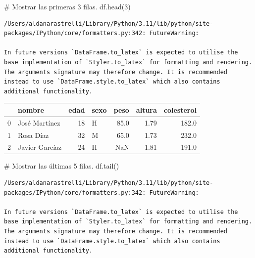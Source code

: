 \documentclass[
  letterpaper,
  DIV=11,
  numbers=noendperiod]{scrreprt}
\newenvironment{Shaded}{\begin{snugshade}}{\end{snugshade}}
\newcommand{\CommentTok}[1]{\textcolor[rgb]{0.37,0.37,0.37}{#1}}
\newcommand{\DecValTok}[1]{\textcolor[rgb]{0.68,0.00,0.00}{#1}}
\newcommand{\NormalTok}[1]{\textcolor[rgb]{0.00,0.23,0.31}{#1}}
\begin{document}
\begin{Shaded}
\begin{Highlighting}[]
\CommentTok{\# Mostrar las primeras 3 filas.}
\NormalTok{df.head(}\DecValTok{3}\NormalTok{)}
\end{Highlighting}
\end{Shaded}

\begin{verbatim}
/Users/aldanarastrelli/Library/Python/3.11/lib/python/site-packages/IPython/core/formatters.py:342: FutureWarning:

In future versions `DataFrame.to_latex` is expected to utilise the base implementation of `Styler.to_latex` for formatting and rendering. The arguments signature may therefore change. It is recommended instead to use `DataFrame.style.to_latex` which also contains additional functionality.
\end{verbatim}

\begin{tabular}{llrlrrr}
\toprule
{} &          nombre &  edad & sexo &  peso &  altura &  colesterol \\
\midrule
0 &   José Martínez &    18 &    H &  85.0 &    1.79 &       182.0 \\
1 &       Rosa Díaz &    32 &    M &  65.0 &    1.73 &       232.0 \\
2 &  Javier Garcíaz &    24 &    H &   NaN &    1.81 &       191.0 \\
\bottomrule
\end{tabular}

\begin{Shaded}
\begin{Highlighting}[]
\CommentTok{\# Mostrar las últimas 5 filas.}
\NormalTok{df.tail()}
\end{Highlighting}
\end{Shaded}

\begin{verbatim}
/Users/aldanarastrelli/Library/Python/3.11/lib/python/site-packages/IPython/core/formatters.py:342: FutureWarning:

In future versions `DataFrame.to_latex` is expected to utilise the base implementation of `Styler.to_latex` for formatting and rendering. The arguments signature may therefore change. It is recommended instead to use `DataFrame.style.to_latex` which also contains additional functionality.
\end{verbatim}
\end{document}
